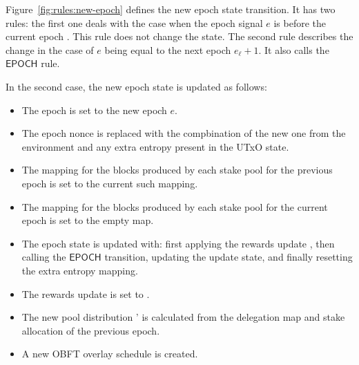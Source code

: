 Figure~\ref{fig:rules:new-epoch} defines the new epoch state transition. It
has two rules: the first one deals with the case when the epoch signal $e$ is before the
current epoch . This rule does not change the state. The second rule
describes the change in the case of $e$ being equal to the next epoch
$e_\ell+ 1$. It also calls the $\mathsf{EPOCH}$ rule.

In the second case, the new epoch state is updated as follows:

\begin{itemize}
\item The epoch is set to the new epoch $e$.
\item The epoch nonce is replaced with the compbination of the new one from the
  environment and any extra entropy present in the UTxO state.
\item The mapping for the blocks produced by each stake pool for the previous epoch
  is set to the current such mapping.
\item The mapping for the blocks produced by each stake pool for the current epoch
  is set to the empty map.
\item The epoch state is updated with: first applying the rewards update ,
  then calling the $\mathsf{EPOCH}$ transition, updating the update state, and finally
  resetting the extra entropy mapping.
\item The rewards update is set to \Nothing.
\item The new pool distribution ' is calculated from the delegation map and
  stake allocation of the previous epoch.
\item A new OBFT overlay schedule is created.
\end{itemize}

